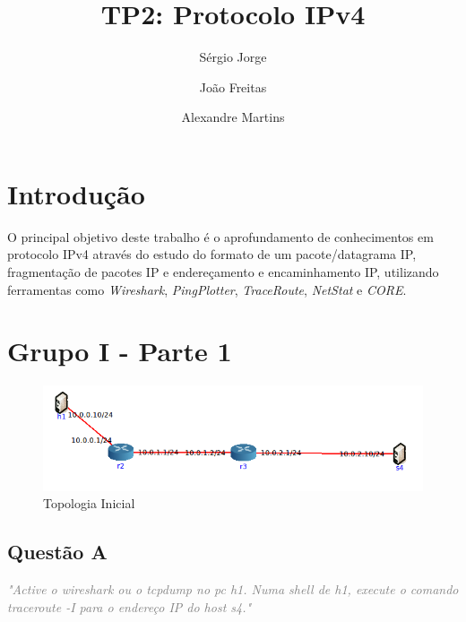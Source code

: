 \documentclass{llncs}
\newcommand{\questionE}[1]{\textcolor{gray}{\textit{"#1"}}}
\begin{document}
\mainmatter
\title{TP2: Protocolo IPv4}


\author{Sérgio Jorge \and João Freitas \and Alexandre Martins}




\date{}


\maketitle
\section{Introdução}
\hspace{3mm} 

O principal objetivo deste trabalho é o aprofundamento de conhecimentos em protocolo IPv4 através do estudo do formato de um pacote/datagrama IP, fragmentação de pacotes IP e endereçamento e encaminhamento IP, utilizando ferramentas como \textit{Wireshark}, \textit{PingPlotter}, \textit{TraceRoute}, \textit{NetStat} e \textit{CORE}. 

\clearpage

\section{Grupo I - Parte 1}

\begin{figure}[H]
\begin{center}
\includegraphics[width=12cm]{topo1.PNG}
\end{center}
\caption{Topologia Inicial}
\end{figure}

\subsection{Questão A}
\hspace{3mm} 
\questionE{Active o wireshark ou o tcpdump no pc h1. Numa shell de h1, execute o comando traceroute -I para o endereço IP do host s4.}\\ 
\end{document}
